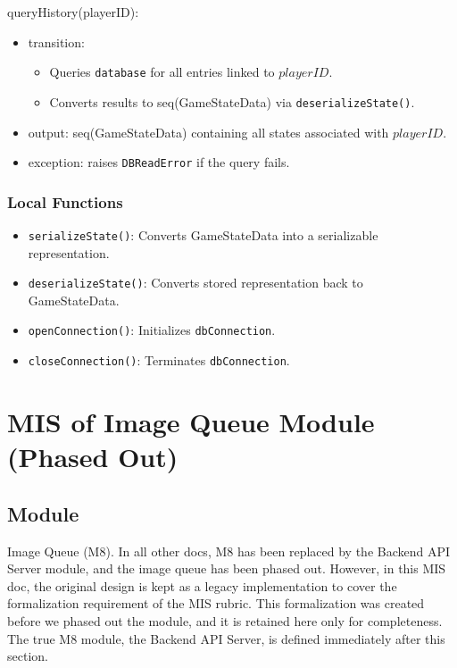\documentclass[12pt, titlepage]{article}
\begin{document}
\noindent queryHistory(playerID):
\begin{itemize}
\item transition:
    \begin{itemize}
        \item Queries \texttt{database} for all entries linked to $playerID$.
        \item Converts results to seq(GameStateData) via \texttt{deserializeState()}.
    \end{itemize}
\item output: seq(GameStateData) containing all states associated with $playerID$.
\item exception: raises \texttt{DBReadError} if the query fails.
\end{itemize}

\subsubsection{Local Functions}
\begin{itemize}
\item \texttt{serializeState()}: Converts GameStateData into a serializable representation.
\item \texttt{deserializeState()}: Converts stored representation back to GameStateData.
\item \texttt{openConnection()}: Initializes \texttt{dbConnection}.
\item \texttt{closeConnection()}: Terminates \texttt{dbConnection}.
\end{itemize}


\section{MIS of Image Queue Module (Phased Out)} \label{M8}

\subsection{Module}
Image Queue (M8).
In all other docs, M8 has been replaced by the Backend API Server module, and the image queue has been phased out.
However, in this MIS doc, the original design is kept as a legacy implementation to cover the formalization requirement
of the MIS rubric.
This formalization was created before we phased out the module, and it is retained here only for completeness.
The true M8 module, the Backend API Server, is defined immediately after this section.
\end{document}
